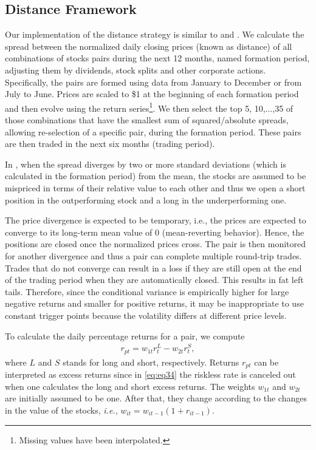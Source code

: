 \documentclass[a4paper]{article}
\begin{document}
	\subsection{Distance Framework}
	
	Our implementation of the distance strategy is similar to \citet*{ggr06} and \citet*{bv12}. We calculate the spread between the normalized daily closing prices (known as distance) of all combinations of stocks pairs during the next 12 months, named formation period, adjusting them by dividends, stock splits and other corporate actions. Specifically, the pairs are formed using data from January to December or from July to June. Prices are scaled to \$1 at the beginning of each formation period and then evolve using the return series\footnote{%
		Missing values have been interpolated.}.  We then select the top 5, 10,...,35 of those combinations that have the smallest sum of squared/absolute spreads, allowing re-selection of a specific pair, during the formation period. These pairs are then traded in the next six months (trading period).
	

In \citet*{ggr06}, when the spread diverges by two or more standard deviations (which is calculated in the formation period) from the mean, the stocks are assumed to be mispriced in terms of their relative value to each other and thus we open a short position in the outperforming stock and a long in the underperforming one. 

The price divergence is expected to be temporary, i.e., the prices are expected to converge to its long-term mean value of 0 (mean-reverting behavior). Hence, the positions are closed once the normalized prices cross. The pair is then monitored for another divergence and thus a pair can complete multiple round-trip trades. Trades that do not converge can result in a loss if they are still open at the end of the trading period when they are automatically closed. This results in fat left tails. Therefore, since the conditional variance is empirically higher for large negative returns and smaller for positive returns, it may be inappropriate to use constant trigger points because the volatility differs at different price levels.

To calculate the daily percentage returns for a pair, we compute%
	\begin{equation}
	\begin{aligned}
	r_{pt}=w_{1t}r_{t}^{L}-w_{2t}r_{t}^{S},
	\end{aligned}
	\label{eq:eq34}
	\end{equation}
	where $L$ and $S$ stands for long and short, respectively. Returns $r_{pt}$ can be interpreted as excess returns since in \eqref{eq:eq34} the riskless rate is canceled out when one calculates the long and short excess returns. The weights $w_{1t}$ and $w_{2t}$ are initially assumed to be one. After that, they change according to the changes in the value of the stocks, \emph{i.e.}, $w_{it}=w_{it-1}(1+r_{it-1})$.
	
\end{document}
